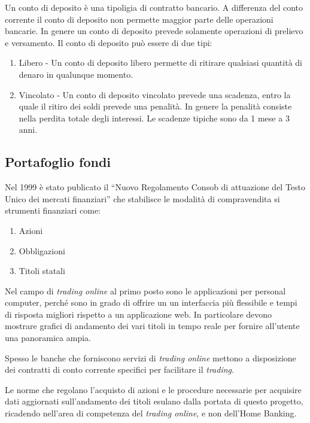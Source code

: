 \documentclass[10pt]{softeng} %
\begin{document}
Un conto di deposito \`e una tipoligia di contratto bancario.
A differenza del conto corrente il conto di deposito non permette maggior parte delle operazioni bancarie.
In genere un conto di deposito prevede solamente operazioni di prelievo e versamento.
Il conto di deposito pu\`o essere di due tipi:
\begin{enumerate}
    \item Libero - Un conto di deposito libero permette di ritirare qualsiasi quantit\`a di denaro in qualunque momento.
    \item Vincolato - Un conto di deposito vincolato prevede una scadenza, entro la quale il ritiro dei soldi prevede una penalit\`a. In genere la penalit\`a consiste nella perdita totale degli interessi. Le scadenze tipiche sono da 1 mese a 3 anni.
\end{enumerate}


\subsection{Portafoglio fondi}

Nel 1999 \`e stato publicato il ``Nuovo Regolamento Consob di attuazione del Testo Unico dei mercati finanziari'' che stabilisce le modalit\`a di compravendita si strumenti finanziari come:
\begin{enumerate}
    \item Azioni
    \item Obbligazioni
    \item Titoli statali
\end{enumerate}

Nel campo di \emph{trading online} al primo posto sono le applicazioni per personal computer, perch\'e sono in grado di offrire un un interfaccia pi\`u flessibile e tempi di risposta migliori rispetto a un applicazione web.
In particolare devono mostrare grafici di andamento dei vari titoli in tempo reale per fornire all'utente una panoramica ampia.

Spesso le banche che forniscono servizi di \emph{trading online} mettono a disposizione dei contratti di conto corrente specifici per facilitare il \emph{trading}.

Le norme che regolano l'acquisto di azioni e le procedure necessarie per acquisire dati aggiornati sull'andamento dei titoli esulano dalla portata di questo progetto, ricadendo nell'area di competenza del \emph{trading online}, e non dell'Home Banking.
\end{document}
